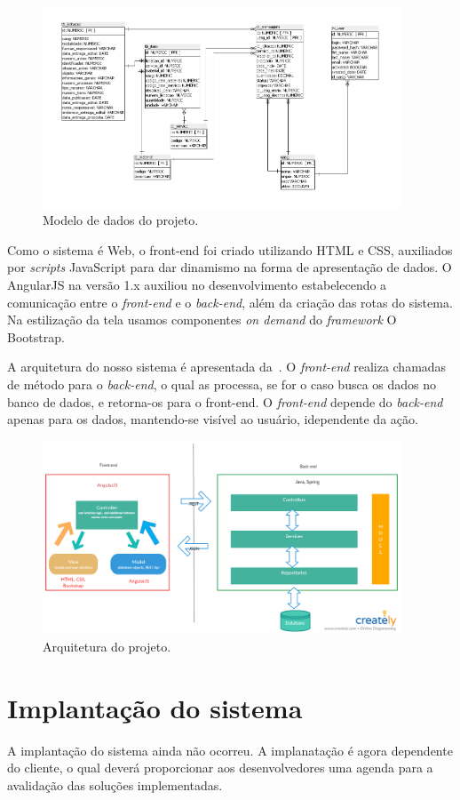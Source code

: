 \begin{figure}
	\includegraphics[width=0.95\textwidth]{figuras/bdAtualizado.png}
	\caption{Modelo de dados do projeto.}
	\label{Figura007}
\end{figure}




Como o sistema é Web, o front-end foi criado utilizando  HTML e CSS, auxiliados por \textit{scripts} JavaScript para dar dinamismo na forma de apresentação de dados.
O AngularJS na versão 1.x auxiliou no desenvolvimento estabelecendo a comunicação entre o \textit{front-end} e o \textit{back-end}, além da criação das rotas do sistema.
Na estilização da tela usamos componentes \textit{on demand} do \textit{framework} O Bootstrap.

A arquitetura do nosso sistema é apresentada da~.
O \textit{front-end} realiza chamadas de método para o \textit{back-end}, o qual as processa, se for o caso busca os dados no banco de dados, e retorna-os para o front-end.
O \textit{front-end} depende do \textit{back-end} apenas para os dados, mantendo-se visível ao usuário, idependente da ação.

\begin{figure}[ht]
    \centering
    \includegraphics[width=0.95\textwidth]{figuras/figura005.png}
    \caption{Arquitetura do projeto.}
    \label{Figura005}
\end{figure}

\section{Implantação do sistema}

A implantação do sistema ainda não ocorreu.
A implanatação é agora dependente do cliente, o qual deverá proporcionar aos desenvolvedores uma agenda para a avalidação das soluções implementadas.